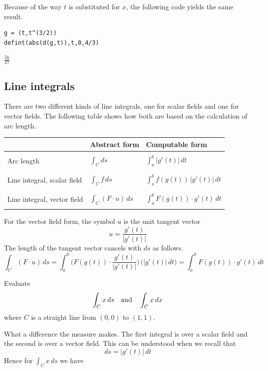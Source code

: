 \bigskip
\noindent
Because of the way $t$ is substituted for $x$,
the following code yields the same result.

\begin{Verbatim}[formatcom=\color{blue},samepage=true]
g = (t,t^(3/2))
defint(abs(d(g,t)),t,0,4/3)
\end{Verbatim}

\noindent
$\displaystyle \tfrac{56}{27}$

\subsection{Line integrals}
There are two different kinds of line integrals,
one for scalar fields and one
for vector fields.
The following table shows how both are based on the calculation of
arc length.

\begin{center}
\begin{tabular}{|l|l|l|}
\hline
& Abstract form
& Computable form
\\
\hline
 & &\\
Arc length
& $\displaystyle{\int_C ds}$
& $\displaystyle{\int_a^b |g'(t)|\,dt}$\\
 & &\\
\hline
 & & \\
Line integral, scalar field
& $\displaystyle{\int_C f\,ds}$
& $\displaystyle{\int_a^b f(g(t))\,|g'(t)|\,dt}$\\
& &\\
\hline
 & & \\
Line integral, vector field
& $\displaystyle{\int_C(F\cdot u)\,ds}$
& $\displaystyle{\int_a^b F(g(t))\cdot g'(t)\,dt}$\\
 & & \\
\hline
\end{tabular}
\end{center}

\noindent
For the vector field form, the symbol $u$ is the unit tangent vector
$$u=\frac{g'(t)}{|g'(t)|}$$
The length of the tangent vector cancels with $ds$
as follows.
$$\int_C(F\cdot u)\,ds
=\int_a^b\bigg(F(g(t))\cdot\frac{g'(t)}{|g'(t)|}\bigg)\,\bigg(|g'(t)|\,dt\bigg)
=\int_a^b F(g(t))\cdot g'(t)\,dt
$$

\noindent
Evaluate
$$\int_Cx\,ds\quad\hbox{and}\quad\int_Cx\,dx$$
where $C$ is a straight line from $(0,0)$ to $(1,1)$.

\bigskip
\noindent
What a difference the measure makes.
The first integral is over a scalar field and the second is over a vector field.
This can be understood when we recall that
$$ds=|g'(t)|\,dt
$$
Hence for $\int_Cx\,ds$ we have

